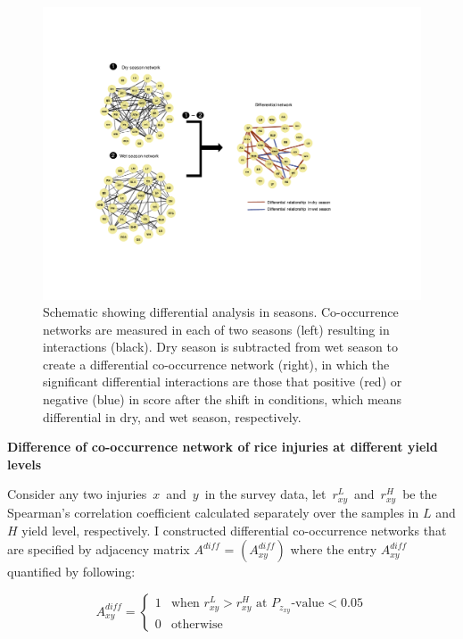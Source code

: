\begin{figure}[h]
\centering
\includegraphics[width = 1\textwidth]{figures/pipeline3.pdf}
\caption[Differential analysis of crop health survey data in season]{Schematic showing differential analysis in seasons. Co-occurrence networks are measured in each of two seasons (left) resulting in interactions (black). Dry season is subtracted from wet season to create a differential co-occurrence network (right), in which the significant differential interactions are those that positive (red) or negative (blue) in score after the shift in conditions, which means differential in dry, and wet season, respectively.}
\label{fig:pipeline3}
\end{figure} 

\textbf{Difference of co-occurrence network of rice injuries at different yield levels}

Consider any two injuries $x$ and $y$ in the survey data, let $r_{xy}^L$ and $r_{xy}^H$ be the Spearman’s correlation coefficient calculated separately over the samples in $L$ and $H$ yield level, respectively. I constructed differential co-occurrence networks that are specified by adjacency matrix $A^{diff}$ = $(A_{xy}^{diff})$ where the entry $A_{xy}^{diff}$ quantified by following:   

\begin{equation}
A_{xy}^{diff} = \left\{\begin{matrix} 1 & \text{when } r_{xy}^L > r_{xy}^H \text{ at } P_{z_{xy}} \text{-value} < 0.05  \\  0 & \text{otherwise}                             
\end{matrix}\right.
\end{equation}

